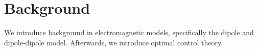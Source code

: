 \documentclass[../../main.tex]{subfiles}
\begin{document}
\def\dir{chapters/background}

\chapter{Background}
\label{ch:background}

We introduce background in electromagnetic models, specifically the dipole and dipole-dipole model. Afterwards, we introduce optimal control theory. 



\end{document}
